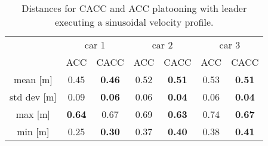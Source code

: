 \begin{table}[]
\begin{tabular}{c|cc|cc|cc|}
\cline{2-7}
                                      & \multicolumn{2}{c|}{car 1}                                    & \multicolumn{2}{c|}{car 2}                                    & \multicolumn{2}{c|}{car 3}                                    \\ \cline{2-7}
\multicolumn{1}{l|}{}                 & \multicolumn{1}{l|}{ACC} & \multicolumn{1}{l|}{{CACC}} & \multicolumn{1}{l|}{ACC} & \multicolumn{1}{l|}{{CACC}} & \multicolumn{1}{l|}{ACC} & \multicolumn{1}{l|}{{CACC}} \\ \hline
\multicolumn{1}{|c|}{mean {[}m{]}} & \multicolumn{1}{c|}{0.45} & \textbf{0.46} & \multicolumn{1}{c|}{0.52} & \textbf{0.51} & \multicolumn{1}{c|}{0.53} & \textbf{0.51} \\ \hline
\multicolumn{1}{|c|}{std dev {[}m{]}} & \multicolumn{1}{c|}{0.09} & \textbf{0.06} & \multicolumn{1}{c|}{0.06} & \textbf{0.04} & \multicolumn{1}{c|}{0.06} & \textbf{0.04} \\ \hline
\multicolumn{1}{|c|}{max {[}m{]}} & \multicolumn{1}{c|}{\textbf{0.64}} & 0.67 & \multicolumn{1}{c|}{0.69} & \textbf{0.63} & \multicolumn{1}{c|}{0.74} & \textbf{0.67} \\ \hline
\multicolumn{1}{|c|}{min {[}m{]}} & \multicolumn{1}{c|}{0.25} & \textbf{0.30} & \multicolumn{1}{c|}{0.37} & \textbf{0.40} & \multicolumn{1}{c|}{0.38} & \textbf{0.41} \\ \hline
\cline{2-7}
\end{tabular}
\caption{Distances for CACC and ACC platooning with leader executing a sinusoidal velocity profile.}
\label{tab:distances_sin_v}
\end{table}
